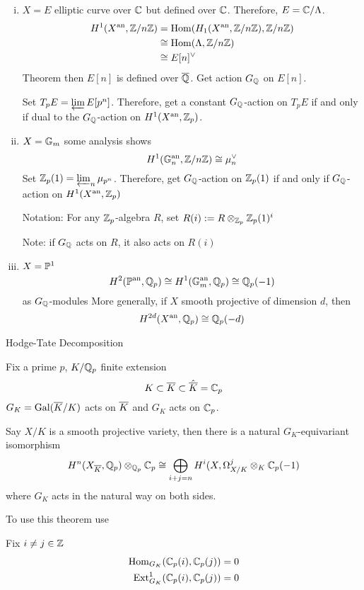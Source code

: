 \begin{ex}
\begin{enumerate}[(i)]
\item $X=E$ elliptic curve over $\C$ but defined over $\C$. Therefore, $E= \C/\Lambda$.
	\[
	\begin{aligned}
	H^1(X\an, \Z/n\Z)&= \Hom(H_1(X\an, \Z/n\Z), \Z/n\Z) \\
	&\cong \Hom(\Lambda, \Z/n\Z) \\
	&\cong E[n]^\vee
	\end{aligned}
	\]
Theorem then $E[n]$ is defined over $\ov{\Q}$. Get action $G_\Q$ on $E[n]$.

Set $T_pE= \plim E[p^n]$. Therefore, get a constant $G_\Q$-action on $T_pE$ if and only if dual to the $G_\Q$-action on $H^1(X\an, \Z_p)$. 

\item $X=\G_m$ some analysis shows
	\[
	H^1(\G_n\an, \Z/n\Z) \cong \mu_n^\vee
	\]
Set $\Z_p(1)= \plim_n \mu_{p^n}$.
Therefore, get $G_\Q$-action on $\Z_p(1)$ if and only if $G_\Q$-action on $H^1(X\an, \Z_p)$


Notation: For any $\Z_p$-algebra $R$, set $R(i):= R \otimes_{\Z_p} \Z_p(1)^i$

Note: if $G_\Q$ acts on $R$, it also acts on $R(i)$


\item $X= \P^1$
	\[
	H^2(\P\an, \Q_p) \cong H^1(\G_m\an, \Q_p) \cong \Q_p(-1)
	\]
as $G_\Q$-modules
More generally, if $X$ smooth projective of dimension $d$, then 
	\[
	H^{2d}(X\an, \Q_p) \cong \Q_p(-d)
	\]
\end{enumerate}
\end{ex}


Hodge-Tate Decomposition

Fix a prime $p$, $K/\Q_p$ finite extension
	\[
	K \subset \ov{K} \subset \hat{\ov{K}}= \C_p
	\]
$G_K= \Gal(\ov{K}/K)$ acts on $\ov{K}$ and $G_K$ acts on $\C_p$.


\begin{thm}
Say $X/K$ is a smooth projective variety, then there is a natural $G_K$-equivariant isomorphism
	\[
	H^n(X_{\ov{K}}, \Q_p) \otimes_{\Q_p} \C_p \cong \bigoplus_{i+j=n} H^i(X, \Omega^j_{X/K} \otimes_K \C_p(-1)
	\]
where $G_K$ acts in the natural way on both sides. 
\end{thm}

To use this theorem use

\begin{thm}[Tate]
Fix $i \neq j \in \Z$
	\[
	\begin{aligned}
	\Hom_{G_K}(\C_p(i), \C_p(j))&= 0 \\
	\Ext_{G_K}^1(\C_p(i),\C_p(j))&= 0
	\end{aligned}
	\]
\end{thm}


